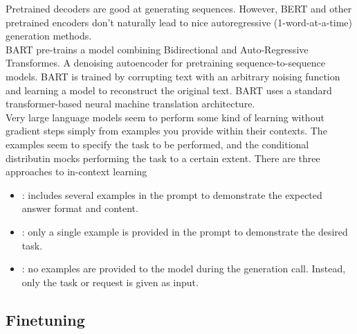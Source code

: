 \documentclass{article}
\begin{document}
Pretrained decoders are good at generating sequences. However, BERT and other pretrained encoders don't naturally lead to nice autoregressive (1-word-at-a-time) generation methods. \\ 

BART pre-trains a model combining Bidirectional and Auto-Regressive Transformes. A denoising autoencoder for pretraining sequence-to-sequence models. BART is trained by corrupting text with an arbitrary noising function and learning a model to reconstruct the original text. BART uses a standard transformer-based neural machine translation architecture. \\ 

Very large language models seem to perform some kind of learning without gradient steps simply from examples you provide within their contexts. The  examples seem to specify the task to be performed, and the conditional distributin mocks performing the task to a certain extent. There are three approaches to in-context learning 
\begin{itemize}
  \item {}: includes several examples in the prompt to demonstrate the expected answer format and content. 
  \item {}: only a single example is provided in the prompt to demonstrate the desired task. 
  \item {}: no examples are provided to the model during the generation call. Instead, only the task or request is given as input. 
\end{itemize}

\subsection{Finetuning}
 
\end{document}
